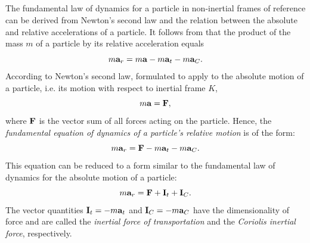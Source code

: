\subsection{}\label{7.2.2} The fundamental law of dynamics for a particle in non-inertial frames of reference can be derived from Newton's second law and the relation between the absolute and relative accel­erations of a particle. It follows from  that the product of the mass $m$ of a particle by its relative acceleration equals
\begin{equation*}%
m \vb{a}_{r} = m \vb{a} - m \vb{a}_{t} - m \vb{a}_{C}.
\end{equation*}
According to Newton's second law, formulated to apply to the absolute motion of a particle, i.e. its motion with respect to inertial frame $K$,
\begin{equation*}%
m \vb{a} = \vb{F},
\end{equation*}
where $\vb{F}$ is the vector sum of all forces acting on the particle. Hence, the \emph{fundamental equation of dynamics of a particle's relative motion} is of the form:
\begin{equation*}%
m \vb{a}_{r} = \vb{F} -  m \vb{a}_{t} - m \vb{a}_{C}.
\end{equation*}
This equation can be reduced to a form similar to the funda­mental law of dynamics for the absolute motion of a particle:
\begin{equation*}%
m \vb{a}_{r} = \vb{F} + \vb{I}_{t} + \vb{I}_{C}.
\end{equation*}
The vector quantities $\vb{I}_{t} = - m\vb{a}_{t}$ and $\vb{I}_{C} = - m\vb{a}_{C}$ have the dimensionality of force and are called the \emph{inertial force of trans­portation} and the \emph{Coriolis inertial force}, respectively.

